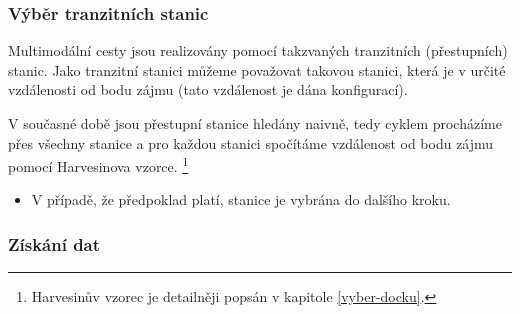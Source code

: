 \documentclass[thesis=M,czech]{FITthesis}[2019/12/23]
\theoremstyle{plain}
\theoremstyle{definition}
\begin{document}
\subsubsection{Výběr tranzitních stanic} \label{vyber-tranzitnich-stanic}

Multimodální cesty jsou realizovány pomocí takzvaných tranzitních (přestupních) stanic. Jako tranzitní stanici můžeme považovat takovou stanici, která je v určité vzdálenosti od bodu zájmu (tato vzdálenost je dána konfigurací). 

V současné době jsou přestupní stanice hledány naivně, tedy cyklem procházíme přes všechny stanice a pro každou stanici spočítáme vzdálenost od bodu zájmu pomocí Harvesinova vzorce\cite{harvesine}. \footnote{Harvesinův vzorec je detailněji popsán v kapitole \ref{vyber-docku}.}
	\begin{itemize}
		\item V případě, že předpoklad platí, stanice je vybrána do dalšího kroku.
	\end{itemize}


% 

\subsubsection{Získání dat}

\end{document}
